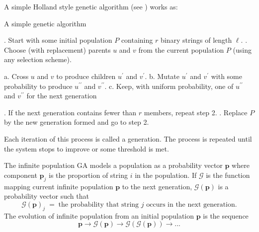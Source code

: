 A simple Holland style genetic algorithm (see \cite{Holland1975}) works as:
\begin{algorithm}
\label{realGA}
\caption*{A simple genetic algorithm}
\begin{algorithmic}[1]
. Start with some initial population $P$ containing $r$ binary strings of length $\ell$.
. Choose (with replacement) parents $u$ and $v$ from the current population $P$ (using any selection scheme).

  \Statex \hspace{\algorithmicindent} a. Cross $u$ and $v$ to produce children $u^\prime$ and $v^\prime$.
  \Statex \hspace{\algorithmicindent} b. Mutate $u^\prime$ and $v^\prime$ with some probability to produce $u^{\prime\prime}$ and $v^{\prime\prime}$.
  \Statex \hspace{\algorithmicindent} c. Keep, with uniform probability, one of $u^{\prime\prime}$ and $v^{\prime\prime}$ for the next generation
 
. If the next generation contains fewer than $r$ members, repeat step 2.
. Replace $P$ by the new generation formed and go to step 2.
\end{algorithmic}
\end{algorithm}

Each iteration of this process is called a generation. 
The process is repeated until the system stops to improve or some threshold is met.

The infinite population GA models a population as a probability vector $\bm{p}$ where component $\bm{p}_j$ 
is the proportion of string $i$ in the population. If $\mathcal{G}$ is the function mapping current infinite population $\bm{p}$ to 
the next generation, $\mathcal{G}(\bm{p})$ is a probability vector such that 
\[
\mathcal{G}(\bm{p})_j \; = \; \text{the probability that string $j$ occurs in the next generation}.
\]
The evolution of infinite population from an initial population $\bm{p}$ is the sequence
\[ \bm{p} \to \mathcal{G}(\bm{p}) \to  {\mathcal{G}}(\mathcal{G}(\bm{p})) \to... \]


